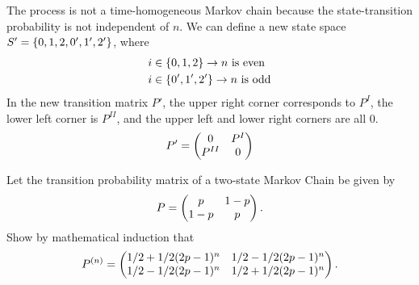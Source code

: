 \documentclass{article}
\begin{document}
    \begin{solution}
        The process is not a time-homogeneous Markov chain because the state-transition probability is not independent of $n$. We can define a new state space $S' = \{0, 1, 2, 0', 1', 2'\}$, where
        \begin{align*}
            i &\in \{0, 1, 2\} \rightarrow n \text{ is even} \\
            i &\in \{0', 1', 2'\} \rightarrow n \text{ is odd} 
        \end{align*}
        In the new transition matrix $P'$, the upper right corner corresponds to $P^I$, the lower left corner is $P^{II}$, and the upper left and lower right corners are all 0.
        \begin{equation*}
            P' = \begin{pmatrix} 0 & P^I \\ P^{II} & 0 \end{pmatrix}
        \end{equation*}
    \end{solution}

    \nextproblem

    \begin{problem}
        Let the transition probability matrix of a two-state Markov Chain be given by
        \begin{equation}
            P = \begin{pmatrix} p & 1 - p \\ 1 - p & p \end{pmatrix}.
            \label{eq:P}
        \end{equation}
        Show by mathematical induction that
        \begin{equation}
            P^{(n)} = \begin{pmatrix} 1/2 + 1/2(2p - 1)^n & 1/2 - 1/2(2p - 1)^n \\ 1/2 - 1/2(2p - 1)^n & 1/2 + 1/2(2p - 1)^n \end{pmatrix}. \label{eq:P_n}
        \end{equation}
    \end{problem}
\end{document}
